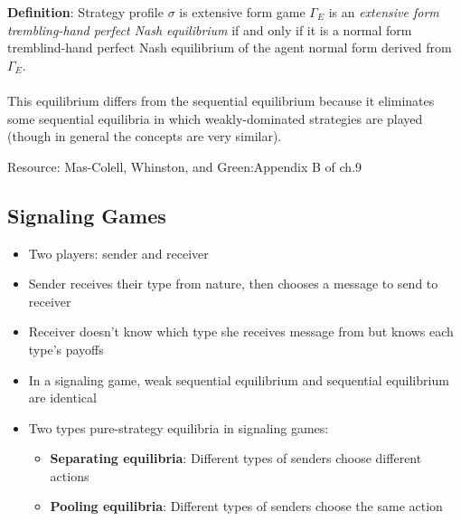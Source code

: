\documentclass{article}
\newcommand{\red}[1]{{\color{red}#1}}
\begin{document}
	\textbf{Definition}: Strategy profile $\sigma$ is extensive form game $\Gamma_E$ is an \textit{extensive form trembling-hand perfect Nash equilibrium} if and only if it is a normal form tremblind-hand perfect Nash equilibrium of the agent normal form derived from $\Gamma_E$. \\
\\
This equilibrium differs from the sequential equilibrium because it eliminates some sequential equilibria in which weakly-dominated strategies are played (though in general the concepts are very similar).

\red{Resource: Mas-Colell, Whinston, and Green:Appendix B of ch.9}

\subsection{Signaling Games}
\begin{itemize}
	\item Two players: sender and receiver
	\item Sender receives their type from nature, then chooses a message to send to receiver
	\item Receiver doesn't know which type she receives message from but knows each type's payoffs
	\item In a signaling game, weak sequential equilibrium and sequential equilibrium are identical 
	\item Two types pure-strategy equilibria in signaling games:
		\begin{itemize}
			\item \textbf{Separating equilibria}: Different types of senders choose different actions 
			\item \textbf{Pooling equilibria}: Different types of senders choose the same action
		\end{itemize}
\end{itemize}
\end{document}
